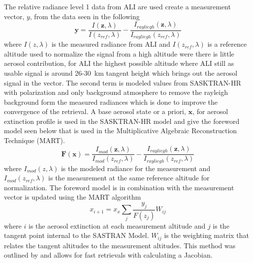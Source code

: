 \documentclass[12pt]{article}
\begin{document}
The relative radiance level 1 data from ALI are used create a measurement vector, $y$, from the data seen in the following
\begin{equation}
    \mathbf{y} = \frac{I(\mathbf{z},\lambda)}{I(z_{ref},\lambda)}-\frac{I_{rayliegh}(\mathbf{z},\lambda)}{I_{rayliegh}(z_{ref},\lambda)}
    \label{eqn:measurementVector}
\end{equation}
where $I(z,\lambda)$ is the measured radiance from ALI and $I(z_{ref},\lambda)$ is a reference altitude used to normalize the signal from a high altitude were there is little aerosol contribution, for ALI the highest possible altitude where ALI still as usable signal is around 26-30~km tangent height which brings out the aerosol signal in the vector. The second term is modeled values from SASKTRAN-HR with polarization and only background atmosphere to remove the rayleigh background form the measured radiances which is done to improve the convergence of the retrieval. A base aerosol state or a priori, $\mathbf{x}$, for aerosol extinction profile is used in the SASKTRAN-HR model and give the foreword model seen below that is used in the Multiplicative Algebraic Reconstruction Technique (MART).
\begin{equation}
    \mathbf{F}(\mathbf{x}) = \frac{I_{mod}(
    \mathbf{z},\lambda)}{I_{mod}(z_{ref},\lambda)}-\frac{I_{rayliegh}(\mathbf{z},\lambda)}{I_{rayliegh}(z_{ref},\lambda)}
    \label{eqn:forewordModel}
\end{equation}
where $I_{mod}(z,\lambda)$ is the modeled radiance for the measurement and $I_{mod}(z_{ref},\lambda)$ is the measurement at the same reference altitude for normalization. The foreword model is in combination with the measurement vector is updated using the MART algorithm
\begin{equation}
    x_{i+1} = x_{x}\sum_{j}\frac{y_{j}}{F(z_{j})}W_{ij}
\end{equation}
where $i$ is the aerosol extinction at each measurement altitude and $j$ is the tangent point internal to the SASTRAN Model. $W_{ij}$ is the weighting matrix that relates the tangent altitudes to the measurement altitudes. This method was outlined by \cite{Degenstein2009} and allows for fast retrievals with calculating a Jacobian.
\end{document}
